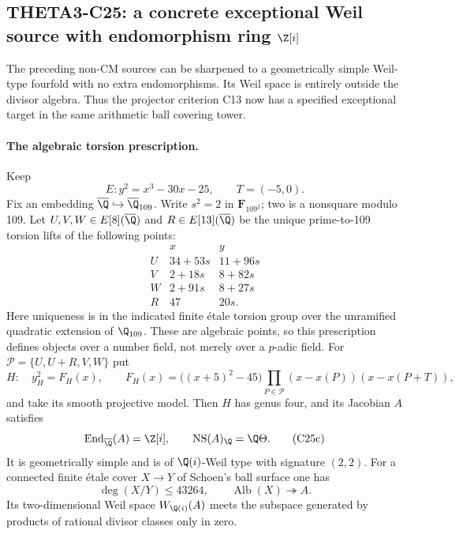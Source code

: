 \subsection{THETA3-C25: a concrete exceptional Weil source with endomorphism ring $\Z[i]$}\label{C25}

The preceding non-CM sources can be sharpened to a geometrically
simple Weil-type fourfold with no extra endomorphisms. Its Weil
space is entirely outside the divisor algebra. Thus the
projector criterion C13 now has a specified exceptional target
in the same arithmetic ball covering tower.

\paragraph{The algebraic torsion prescription.}
Keep
\[
 E:y^2=x^3-30x-25,\qquad T=(-5,0).
\]
Fix an embedding $\overline\Q\hookrightarrow\overline\Q_{109}$.
Write $s^2=2$ in $\mathbf F_{109^2}$; two is a nonsquare
modulo 109. Let $U,V,W\in E[8](\overline\Q)$ and
$R\in E[13](\overline\Q)$ be the unique prime-to-109
torsion lifts of the following points:
\[
\begin{array}{c|cc}
 &x&y\\\hline
 U&34+53s&11+96s\\
 V&2+18s&8+82s\\
 W&2+91s&8+27s\\
 R&47&20s .
\end{array}
 \tag{C25a}
\]
Here uniqueness is in the indicated finite \'etale torsion
group over the unramified quadratic extension of $\Q_{109}$.
These are algebraic points, so this prescription defines
objects over a number field, not merely over a $p$-adic field.
For $\mathcal P=\{U,U+R,V,W\}$ put
\[
 H:\quad y_H^2=F_H(x),\qquad
 F_H(x)=\bigl((x+5)^2-45\bigr)
       \prod_{P\in\mathcal P}(x-x(P))(x-x(P+T)),
 \tag{C25b}
\]
and take its smooth projective model. Then $H$ has genus four,
and its Jacobian $A$ satisfies
\[
 \operatorname{End}_{\overline\Q}(A)=\Z[i],\qquad
 \operatorname{NS}(A)_\Q=\Q\Theta.
 \tag{C25c}
\]
It is geometrically simple and is of $\Q(i)$-Weil type with
signature $(2,2)$. For a connected finite \'etale cover
$X\to Y$ of Schoen's ball surface one has
\[
 \deg(X/Y)\leq43264,\qquad
 \operatorname{Alb}(X)\twoheadrightarrow A.
 \tag{C25d}
\]
Its two-dimensional Weil space $W_{\Q(i)}(A)$ meets the
subspace generated by products of rational divisor classes
only in zero.

